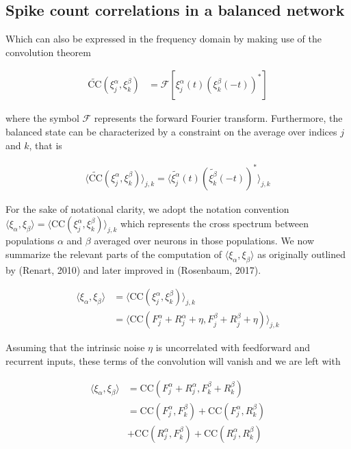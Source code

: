 \documentclass{ucetd}
\begin{document}
\subsection{Spike count correlations in a balanced network}


Which can also be expressed in the frequency domain by making use of the convolution theorem

\begin{align}
\widetilde{\mathrm{CC}}(\xi_{j}^{\alpha},\xi_{k}^{\beta})  &= \mathcal{F}\left[\xi_{j}^{\alpha}(t)(\xi_{k}^{\beta}(-t))^{*}\right] 
\end{align}

where the symbol $\mathcal{F}$ represents the forward Fourier transform. Furthermore, the balanced state can be characterized by a constraint on the average over indices $j$ and $k$, that is 

\begin{align}
\langle \widetilde{\mathrm{CC}}(\xi_{j}^{\alpha},\xi_{k}^{\beta})\rangle_{j,k} = \langle \widetilde{\xi_{j}^{\alpha}}(t)(\widetilde{\xi_{k}^{\beta}}(-t))^{*} \rangle_{j,k}
\end{align}

For the sake of notational clarity, we adopt the notation convention $\langle \xi_{\alpha}, \xi_{\beta}\rangle = \langle \mathrm{CC}(\xi_{j}^{\alpha},\xi_{k}^{\beta})\rangle_{j,k}$ which represents the cross spectrum between populations $\alpha$ and $\beta$ averaged over neurons in those populations. We now summarize the relevant parts of the computation of $\langle \xi_{\alpha}, \xi_{\beta}\rangle$ as originally outlined by (Renart, 2010) and later improved in (Rosenbaum, 2017).

\begin{align}
\langle \xi_{\alpha}, \xi_{\beta}\rangle &= \langle \mathrm{CC}(\xi_{j}^{\alpha},\xi_{k}^{\beta})\rangle_{j,k}\\
&= \langle \mathrm{CC}(F_{j}^{\alpha} + R_{j}^{\alpha} + \eta,F_{j}^{\beta} + R_{j}^{\beta} + \eta)\rangle_{j,k}
\end{align}

Assuming that the intrinsic noise $\eta$ is uncorrelated with feedforward and recurrent inputs, these terms of the convolution will vanish and we are left with 

\begin{align*}
\langle \xi_{\alpha}, \xi_{\beta}\rangle &= \mathrm{CC}(F_{j}^{\alpha} + R_{j}^{\alpha},F_{k}^{\beta} + R_{k}^{\beta})\\
&= \mathrm{CC}(F_{j}^{\alpha},F_{k}^{\beta}) + \mathrm{CC}(F_{j}^{\alpha},R_{k}^{\beta})\\
&+ \mathrm{CC}(R_{j}^{\alpha},F_{k}^{\beta}) + \mathrm{CC}(R_{j}^{\alpha},R_{k}^{\beta})
\end{align*}
\end{document}

